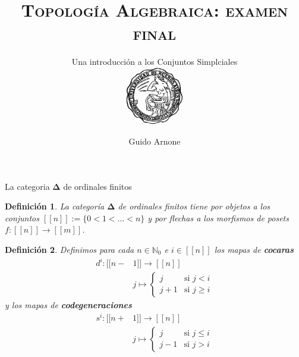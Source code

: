 \documentclass[11pt]{beamer}
\newcommand{\N}{\mathbb{N}}
\newcommand{\nat}[1]{[\![#1]\!]}
\newcommand{\ord}[1]{\nat{#1}}
\newcommand{\ordcat}{\boldsymbol{\Delta}}
\newtheorem{defs}{Definición}
\begin{document}
\author{Guido Arnone}
\title{\scshape Topología Algebraica: examen final}
\subtitle{Una introducción a los Conjuntos Simplciales\\
\vspace{20pt}
\includegraphics[width=2.5cm]{uba2.jpg}}
\logo{}
\date{}
\subject{Topología Algebraica}


\begin{frame}
\titlepage
\end{frame}

\begin{frame}{La categoria $\ordcat$ de ordinales finitos}
\begin{defs} La categoría $\ordcat$ de ordinales finitos \texttt{}tiene por objetos a los conjuntos $\nat{n} := \{0 < 1 < \dots < n\}$ y por flechas a los morfismos de posets $f : \nat{n} \to \nat{m}$.
\end{defs}

\begin{defs} Definimos para cada $n \in \N_0$ e $i \in \ord{n}$ los mapas de \textbf{cocaras} 
\begin{align*}
d^i : \ord{n-&1} \to \ord{n}\\
&j \mapsto \begin{cases}
j &\text{si $j < i$}\\
j+1 &\text{si $j \geq i$}
\end{cases}
\end{align*}
y los mapas de \textbf{codegeneraciones}
\begin{align*}
s^i : \ord{n+&1} \to \ord{n}\\
&j \mapsto \begin{cases}
j &\text{si $j \leq i$}\\
j-1 &\text{si $j > i$}
\end{cases}
\end{align*}
\end{defs}
\end{frame}
\end{document}
